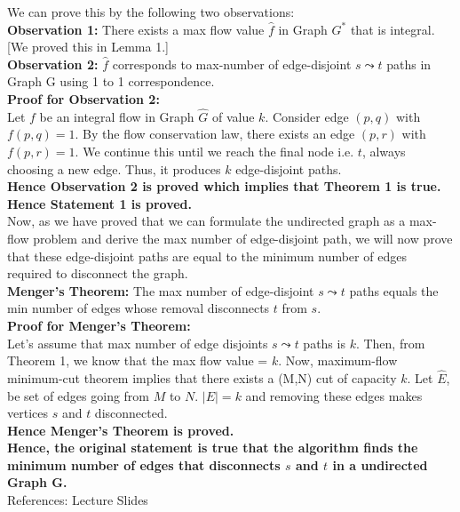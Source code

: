 \documentclass{article}
\newcommand{\curvy}{\mathrel{\leadsto}}
\begin{document}
We can prove this by the following two observations:\\
\textbf{Observation 1:} There exists a max flow value $\hat{f}$ in Graph $G^*$ that is integral. [We proved this in Lemma 1.]\\
\textbf{Observation 2:} $\hat{f}$ corresponds to max-number of edge-disjoint $s\curvy t$ paths in Graph G using 1 to 1 correspondence.\\
\textbf{Proof for Observation 2:}\\
Let $f$ be an integral flow in Graph $\hat{G}$ of value $k$. Consider edge $(p,q)$ with $f(p,q)=1$. By the flow conservation law, there exists an edge $(p,r)$ with $f(p,r)=1$. We continue this until we reach the final node i.e. $t$, always choosing a new edge. Thus, it produces $k$ edge-disjoint paths.\\
\textbf{Hence Observation 2 is proved which implies that Theorem 1 is true.}
\textbf{Hence Statement 1 is proved.}\\

Now, as we have proved that we can formulate the undirected graph as a max-flow problem and derive the max number of edge-disjoint path, we will now prove that these edge-disjoint paths are equal to the minimum number of edges required to disconnect the graph.\\
\textbf{Menger's Theorem:} The max number of edge-disjoint $s\curvy t$ paths equals the min number of edges whose removal disconnects $t$ from $s$.\\
\textbf{Proof for Menger's Theorem:}\\ 
Let's assume that max number of edge disjoints $s\curvy t$ paths is $k$. Then, from Theorem 1, we know that the max flow value = $k$. Now, maximum-flow minimum-cut theorem implies that there exists a (M,N) cut of capacity $k$. Let $\hat{E}$, be set of edges going from $M$ to $N$. $|E|=k$ and removing these edges makes vertices $s$ and $t$ disconnected.\\
\textbf{Hence Menger's Theorem is proved.}\\

\textbf{Hence, the original statement is true that the algorithm finds the minimum number of edges that disconnects $s$ and $t$ in a undirected Graph G.}\\
References: Lecture Slides\\\\
\end{document}
